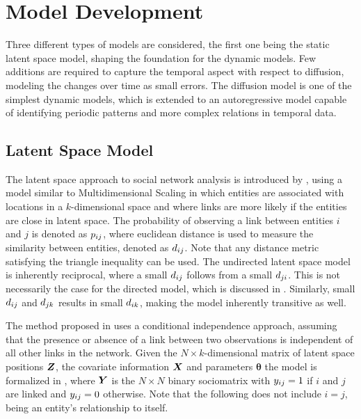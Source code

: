 \section{Model Development}

Three different types of models are considered, the first one being the static latent space model, shaping the foundation for the dynamic models.
Few additions are required to capture the temporal aspect with respect to diffusion, modeling the changes over time as small errors. The diffusion model is one of the simplest dynamic models, which is extended to an autoregressive model capable of identifying periodic patterns and more complex relations in temporal data.

\subsection{Latent Space Model}

    The latent space approach to social network analysis is introduced by \citeauthor{hoff2002latent} \cite{hoff2002latent}, using a model similar to Multidimensional Scaling in which entities are associated with locations in a $k$-dimensional space and where links are more likely if the entities are close in latent space. 
    The probability of observing a link between entities $i$ and $j$ is denoted as $\sub(p)$, where euclidean distance is used to measure the similarity between entities, denoted as $\sub(d)$. Note that any distance metric satisfying the triangle inequality can be used.
    The undirected latent space model is inherently reciprocal, where a small $\sub(d)$ follows from a small $\sub(d)(ji)$. This is not necessarily the case for the directed model, which is discussed in .
    Similarly, small $\sub(d)$ and $\sub(d)(jk)$ results in small $\sub(d)(ik)$, making the model inherently transitive as well.
    
    The method proposed in \cite{hoff2002latent} uses a conditional independence approach, assuming that the presence or absence of a link between two observations is independent of all other links in the network. Given the $N\times k$-dimensional matrix of latent space positions $\bm{Z}$, the covariate information $\bm{X}$ and parameters $\bm{\theta}$ the model is formalized in , where $\bm{Y}$ is the $N\times N$ binary sociomatrix with $\sub(y)=1$ if $i$ and $j$ are linked and $\sub(y)=0$ otherwise. Note that the following does not include $i=j$, being an entity's relationship to itself.
    
